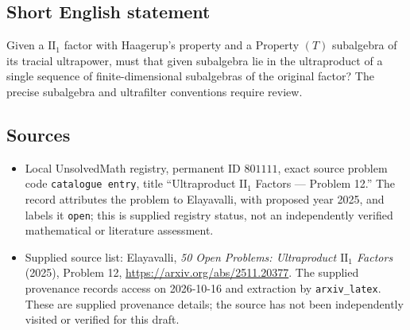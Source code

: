 \documentclass[11pt]{article}
\begin{document}
\subsection{Short English statement}
Given a \(\mathrm{II}_1\) factor with Haagerup's property and a Property \((T)\) subalgebra of its tracial ultrapower, must that given subalgebra lie in the ultraproduct of a single sequence of finite-dimensional subalgebras of the original factor? The precise subalgebra and ultrafilter conventions require review.
\subsection{Sources}
\begin{itemize}
\item Local UnsolvedMath registry, permanent ID \(801111\), exact source problem code \texttt{catalogue entry}, title ``Ultraproduct \(\mathrm{II}_1\) Factors --- Problem 12.'' The record attributes the problem to Elayavalli, with proposed year 2025, and labels it \texttt{open}; this is supplied registry status, not an independently verified mathematical or literature assessment.
\item Supplied source list: Elayavalli, \emph{50 Open Problems: Ultraproduct \(\mathrm{II}_1\) Factors} (2025), Problem 12, \url{https://arxiv.org/abs/2511.20377}. The supplied provenance records access on 2026-10-16 and extraction by \texttt{arxiv\_latex}. These are supplied provenance details; the source has not been independently visited or verified for this draft.
\end{itemize}
\end{document}
